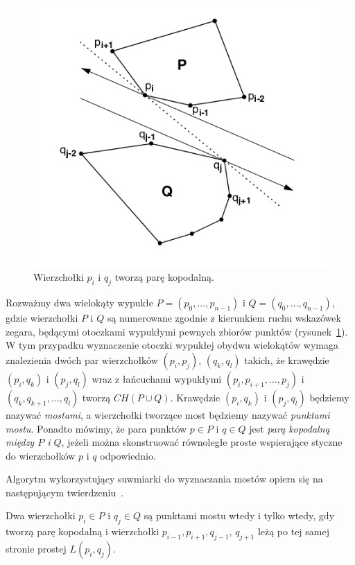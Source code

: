 \begin{figure}[htb]
  \centering
  \includegraphics[scale=0.5]{img/calipers4}
  \caption{\label{img:calipers4} Wierzchołki $p_i$ i $q_j$ tworzą parę
    kopodalną.}
\end{figure}

Rozważmy dwa wielokąty wypukłe $P = (p_0, \ldots, p_{n-1})$ i $Q =
(q_0, \ldots, q_{n-1})$, gdzie wierzchołki $P$ i $Q$ są numerowane
zgodnie z kierunkiem ruchu wskazówek zegara, będącymi otoczkami
wypukłymi pewnych zbiorów punktów (rysunek~\ref{img:calipers4}). W tym
przypadku wyznaczenie otoczki wypukłej obydwu wielokątów wymaga
znalezienia dwóch par wierzchołków $(p_i, p_j)$, $(q_k, q_l)$ takich,
że krawędzie $(p_i, q_k)$ i $(p_j, q_l)$ wraz z łańcuchami wypukłymi
$(p_i, p_{i+1}, \ldots, p_j)$ i $(q_k, q_{k+1}, \ldots, q_l)$ tworzą
$CH(P \cup Q)$. Krawędzie $(p_i, q_k)$ i $(p_j, q_l)$ będziemy nazywać
\emph{mostami}, a wierzchołki tworzące most będziemy nazywać
\emph{punktami mostu}. Ponadto mówimy, że para punktów $p \in P$ i $q
\in Q$ jest \emph{parą kopodalną między $P$ i $Q$}, jeżeli można
skonstruować równoległe proste wspierające styczne do wierzchołków $p$
i $q$ odpowiednio.

Algorytm wykorzystujący suwmiarki do wyznaczania mostów opiera się na
następującym twierdzeniu~\cite{Toussaint83}.

\begin{twierdzenie}[Toussaint 1983]
\label{thm:bridge}
Dwa wierzchołki $p_i \in P$ i $q_j \in Q$ są punktami mostu wtedy i
tylko wtedy, gdy tworzą parę kopodalną i wierzchołki $p_{i-1},
p_{i+1}, q_{j-1}$, $ q_{j+1}$ leżą po tej samej stronie prostej
$L(p_i, q_j)$.
\end{twierdzenie}

